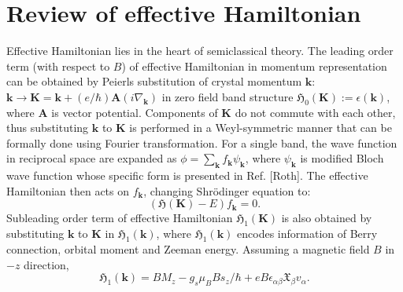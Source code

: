 \documentclass[aps, prb, showpacs, twocolumn, notitlepage, superscriptaddress]{revtex4-1}
\begin{document}



\appendix

\section{Review of effective Hamiltonian}\label{app:revieweffham}

Effective Hamiltonian lies in the heart of semiclassical theory. The leading order term (with respect to $B$) of effective Hamiltonian in momentum representation can be obtained by Peierls substitution of crystal momentum $\boldsymbol{k}$: $\boldsymbol{k}\to\boldsymbol{K}=\boldsymbol{k}+(e/\hbar)\boldsymbol{A}(i\nabla_{\boldsymbol{k}})$ in zero field band structure $\mathfrak{H}_{0}(\boldsymbol{K}):=\epsilon(\boldsymbol{k})$, where $\boldsymbol{A}$ is vector potential. Components of $\boldsymbol{K}$ do not commute with each other, thus substituting $\boldsymbol{k}$ to $\boldsymbol{K}$ is performed in a Weyl-symmetric manner that can be formally done using Fourier transformation. For a single band, the wave function in reciprocal space are expanded as $\phi=\sum_{\boldsymbol{k}}f_{\boldsymbol{k}}\psi_{\boldsymbol{k}}$, where $\psi_{\boldsymbol{k}}$ is modified Bloch wave function whose specific form is presented in Ref. [Roth]. The effective Hamiltonian then acts on $f_{\boldsymbol{k}}$, changing Shr\"odinger equation to:
\begin{equation}
(\mathfrak{H}(\boldsymbol{K})-E)f_{\boldsymbol{k}}=0.\label{eq:schrodinger}
\end{equation}
Subleading order term of effective Hamiltonian $\mathfrak{H}_{1}(\boldsymbol{K})$ is also obtained by substituting $\boldsymbol{k}$ to $\boldsymbol{K}$ in $\mathfrak{H}_{1}(\boldsymbol{k})$, where $\mathfrak{H}_{1}(\boldsymbol{k})$ encodes information of Berry connection, orbital moment and Zeeman energy. Assuming a magnetic field $B$ in $-z$ direction,
\begin{equation}
\mathfrak{H}_{1}(\boldsymbol{k})=BM_{z}-g_s\mu_{B}Bs_z/\hbar+eB\epsilon_{\alpha\beta}\mathfrak{X}_{\beta}v_{\alpha}.
\end{equation}
\end{document}

